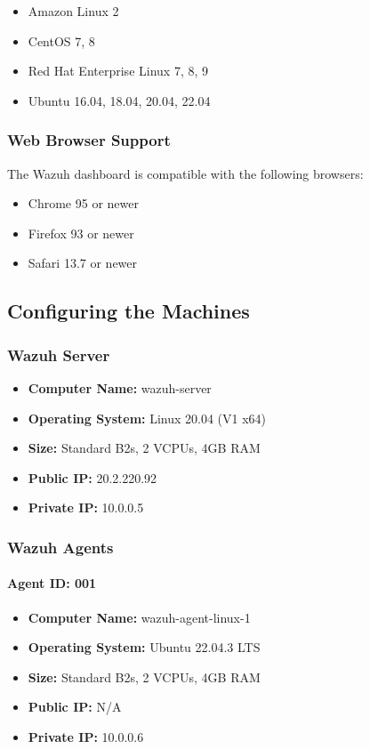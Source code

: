 \begin{itemize}
\item Amazon Linux 2
\item CentOS 7, 8
\item Red Hat Enterprise Linux 7, 8, 9
\item Ubuntu 16.04, 18.04, 20.04, 22.04
\end{itemize}

\subsubsection{Web Browser Support}

The Wazuh dashboard is compatible with the following browsers:

\begin{itemize}
\item Chrome 95 or newer
\item Firefox 93 or newer
\item Safari 13.7 or newer
\end{itemize}

\subsection{Configuring the Machines}

\subsubsection{Wazuh Server}
\begin{itemize}
    \item \textbf{Computer Name:} wazuh-server
    \item \textbf{Operating System:} Linux 20.04 (V1 x64)
    \item \textbf{Size:} Standard B2s, 2 VCPUs, 4GB RAM
    \item \textbf{Public IP:} 20.2.220.92
    \item \textbf{Private IP:} 10.0.0.5
\end{itemize}

\subsubsection{Wazuh Agents}
\label{installed-agents}
\paragraph*{Agent ID: 001}
\begin{itemize}
    \item \textbf{Computer Name:} wazuh-agent-linux-1
    \item \textbf{Operating System:} Ubuntu 22.04.3 LTS
    \item \textbf{Size:} Standard B2s, 2 VCPUs, 4GB RAM
    \item \textbf{Public IP:} N/A
    \item \textbf{Private IP:} 10.0.0.6
\end{itemize}

